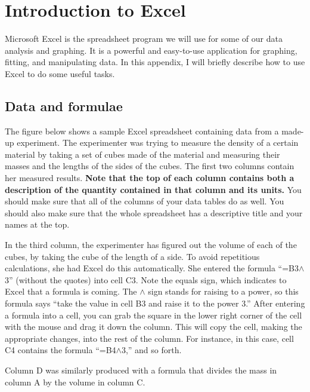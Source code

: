 \section{Introduction to Excel}


\bigskip

Microsoft Excel is the spreadsheet program we will use for some of our
data analysis and graphing.  It is a powerful and easy-to-use
application for graphing, fitting, and manipulating data. In this
appendix, I will briefly describe how to use Excel to do some useful
tasks.  

\subsection{Data and formulae}

The figure below shows a sample Excel spreadsheet containing data
from a made-up experiment.  The experimenter was trying to measure
the density of a certain material by taking a set of cubes
made of the material and measuring their masses and the lengths of
the sides of the cubes.  The first two columns contain her measured
results.  \textbf{Note that the top of each column contains both
a description of the quantity contained in that column and its units.}
You should make sure that all of the columns of your data tables do as well.
You should also make sure that the whole spreadsheet has a descriptive
title and your names at the top.

In the third column, the experimenter has figured out the volume
of each of the cubes, by taking the cube of the length of a side.
To avoid repetitious calculations, she had Excel do this automatically.
She entered the formula ``=B3$\wedge$3'' (without the quotes) into cell C3.
Note the equals sign, which indicates to Excel that a formula is coming.
The $\wedge$ sign stands for raising to a power, so this
formula says ``take the value in cell B3 and raise it to the power 3.''
After entering a formula
into a cell, you can grab the square in the lower right corner of the
cell with the mouse and drag it down the column.  This will copy
the cell, making the appropriate changes, into the rest of the column.
For instance, in this case, cell C4 contains the formula ``=B4$\wedge$3,''
and so forth.

Column D was similarly produced with a formula that divides the
mass in column A by the volume in column C.

